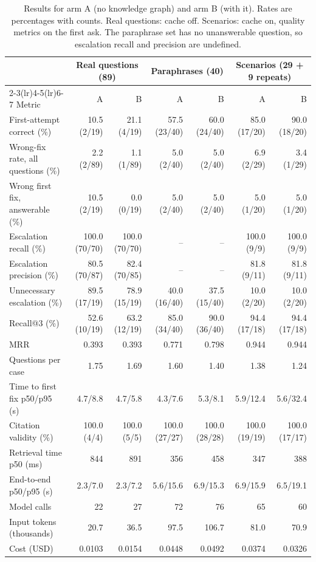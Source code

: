 \begin{table}[t]
\caption{Results for arm A (no knowledge graph) and arm B (with it). Rates are percentages with counts. Real questions: cache off. Scenarios: cache on, quality metrics on the first ask. The paraphrase set has no unanswerable question, so escalation recall and precision are undefined.}
\label{tab:main}
\centering
\footnotesize
\setlength{\tabcolsep}{4.5pt}
\begin{tabular}{@{}lrrrrrr@{}}
\toprule
 & \multicolumn{2}{c}{Real questions (89)} & \multicolumn{2}{c}{Paraphrases (40)} & \multicolumn{2}{c}{Scenarios (29 + 9 repeats)} \\
\cmidrule(lr){2-3}\cmidrule(lr){4-5}\cmidrule(lr){6-7}
Metric & A & B & A & B & A & B \\
\midrule
First-attempt correct (\%) & 10.5 (2/19) & 21.1 (4/19) & 57.5 (23/40) & 60.0 (24/40) & 85.0 (17/20) & 90.0 (18/20) \\
Wrong-fix rate, all questions (\%) & 2.2 (2/89) & 1.1 (1/89) & 5.0 (2/40) & 5.0 (2/40) & 6.9 (2/29) & 3.4 (1/29) \\
Wrong first fix, answerable (\%) & 10.5 (2/19) & 0.0 (0/19) & 5.0 (2/40) & 5.0 (2/40) & 5.0 (1/20) & 5.0 (1/20) \\
Escalation recall (\%) & 100.0 (70/70) & 100.0 (70/70) & -- & -- & 100.0 (9/9) & 100.0 (9/9) \\
Escalation precision (\%) & 80.5 (70/87) & 82.4 (70/85) & -- & -- & 81.8 (9/11) & 81.8 (9/11) \\
Unnecessary escalation (\%) & 89.5 (17/19) & 78.9 (15/19) & 40.0 (16/40) & 37.5 (15/40) & 10.0 (2/20) & 10.0 (2/20) \\
Recall@3 (\%) & 52.6 (10/19) & 63.2 (12/19) & 85.0 (34/40) & 90.0 (36/40) & 94.4 (17/18) & 94.4 (17/18) \\
MRR & 0.393 & 0.393 & 0.771 & 0.798 & 0.944 & 0.944 \\
Questions per case & 1.75 & 1.69 & 1.60 & 1.40 & 1.38 & 1.24 \\
Time to first fix p50/p95 (s) & 4.7/8.8 & 4.7/5.8 & 4.3/7.6 & 5.3/8.1 & 5.9/12.4 & 5.6/32.4 \\
Citation validity (\%) & 100.0 (4/4) & 100.0 (5/5) & 100.0 (27/27) & 100.0 (28/28) & 100.0 (19/19) & 100.0 (17/17) \\
Retrieval time p50 (ms) & 844 & 891 & 356 & 458 & 347 & 388 \\
End-to-end p50/p95 (s) & 2.3/7.0 & 2.3/7.2 & 5.6/15.6 & 6.9/15.3 & 6.9/15.9 & 6.5/19.1 \\
\midrule
Model calls & 22 & 27 & 72 & 76 & 65 & 60 \\
Input tokens (thousands) & 20.7 & 36.5 & 97.5 & 106.7 & 81.0 & 70.9 \\
Cost (USD) & 0.0103 & 0.0154 & 0.0448 & 0.0492 & 0.0374 & 0.0326 \\
\bottomrule
\end{tabular}
\end{table}
